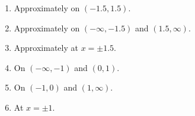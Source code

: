 {%
\begin{minipage}{\linewidth}\end{minipage}
}
{	\begin{enumerate}
\item		Approximately on $(-1.5,1.5)$.
\item		Approximately on $(-\infty,-1.5)$ and $ (1.5,\infty)$.
\item		Approximately at $x=\pm 1.5$.
\item		On $(-\infty,-1)$ and $(0,1)$.
\item		On $(-1,0)$ and $(1,\infty)$.
\item		At $x=\pm 1$.
\end{enumerate}
}
